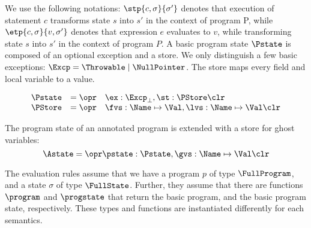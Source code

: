 We use the following notations: 
$\stp{c,\sigma}{\sigma'}$  denotes that execution of statement $c$
transforms state $s$ into $s'$ in the context of program P, while
$\etp{c,\sigma}{v,\sigma'}$  denotes that expression $e$ evaluates to
$v$, while transforming state $s$ into $s'$ in the context of program
\(P\). A basic program state \(\Pstate\) is composed of an optional
exception and a store. We only distinguish a few basic exceptions: 
\(\Excp = \Throwable \mid \NullPointer\). The store maps every field
and local variable to a value.

\[
\begin{array}{rcl}
\Pstate & = \opr & \ex : \Excp_{\bot}, \st : \PStore \clr\\
\PStore & = \opr & \fvs : \Name \mapsto \Val, \lvs : \Name \mapsto \Val \clr
\end{array}
\]

The program state of an annotated program is extended with a store for
ghost variables:
\[
\Astate = \opr \pstate : \Pstate, \gvs : \Name \mapsto \Val \clr
\]

The evaluation rules assume that we have a program \(p\) of type
\(\FullProgram\), and a state \(\sigma\) of type
\(\FullState\). Further, they assume that there are functions
\(\program\) and \(\progstate\) that return the basic program, and the
basic program state, respectively. These types and functions are
instantiated differently for each semantics. 


